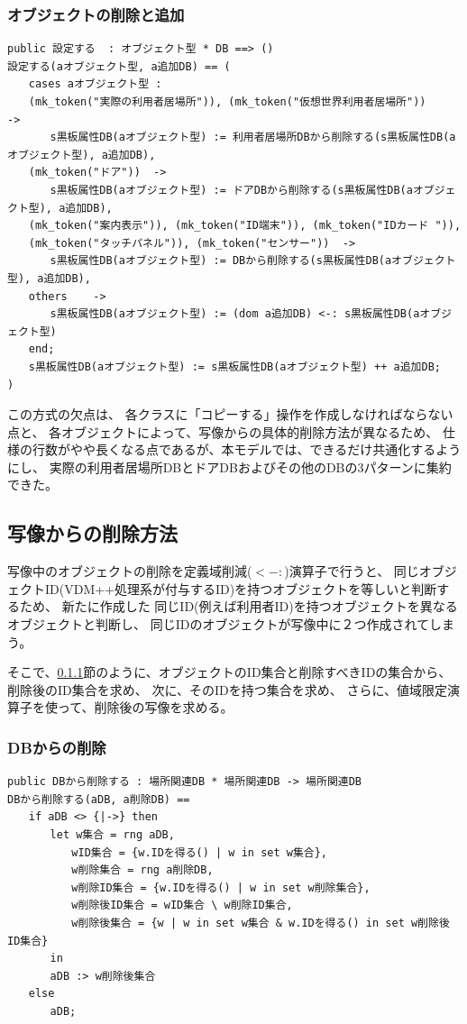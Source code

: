 \documentclass[a4paper,8pt]{jsarticle}
\begin{document}
\subsubsection{オブジェクトの削除と追加}
\label{subsubsection:deleteAndAppend}
\begin{verbatim}
public 設定する  : オブジェクト型 * DB ==> ()
設定する(aオブジェクト型, a追加DB) == (
　　cases aオブジェクト型 :
　　(mk_token("実際の利用者居場所")), (mk_token("仮想世界利用者居場所"))		->
　　　　s黒板属性DB(aオブジェクト型) := 利用者居場所DBから削除する(s黒板属性DB(aオブジェクト型), a追加DB),
　　(mk_token("ドア"))	-> 
　　　　s黒板属性DB(aオブジェクト型) := ドアDBから削除する(s黒板属性DB(aオブジェクト型), a追加DB),
　　(mk_token("案内表示")), (mk_token("ID端末")), (mk_token("IDカード ")), 
　　(mk_token("タッチパネル")), (mk_token("センサー"))	->
　　　　s黒板属性DB(aオブジェクト型) := DBから削除する(s黒板属性DB(aオブジェクト型), a追加DB),
　　others	->
　　　　s黒板属性DB(aオブジェクト型) := (dom a追加DB) <-: s黒板属性DB(aオブジェクト型)
　　end;
　　s黒板属性DB(aオブジェクト型) := s黒板属性DB(aオブジェクト型) ++ a追加DB;
)
\end{verbatim}


この方式の欠点は、
各クラスに「コピーする」操作を作成しなければならない点と、
各オブジェクトによって、写像からの具体的削除方法が異なるため、
仕様の行数がやや長くなる点であるが、本モデルでは、できるだけ共通化するようにし、
実際の利用者居場所DBとドアDBおよびその他のDBの3パターンに集約できた。

\subsection {写像からの削除方法}
\label{subsec:delete}
写像中のオブジェクトの削除を定義域削減($ <-:$)演算子で行うと、
同じオブジェクトID(VDM++処理系が付与するID)を持つオブジェクトを等しいと判断するため、
新たに作成した
同じID(例えば利用者ID)を持つオブジェクトを異なるオブジェクトと判断し、
同じIDのオブジェクトが写像中に２つ作成されてしまう。

そこで、\ref{subsubsection:deleteFromDB}節のように、オブジェクトのID集合と削除すべきIDの集合から、
削除後のID集合を求め、
次に、そのIDを持つ集合を求め、
さらに、値域限定演算子を使って、削除後の写像を求める。

\subsubsection{DBからの削除}
\label{subsubsection:deleteFromDB}
\begin{verbatim}
public DBから削除する : 場所関連DB * 場所関連DB -> 場所関連DB
DBから削除する(aDB, a削除DB) == 
　　if aDB <> {|->} then
　　　　let w集合 = rng aDB,
　　　　　　wID集合 = {w.IDを得る() | w in set w集合},
　　　　　　w削除集合 = rng a削除DB,
　　　　　　w削除ID集合 = {w.IDを得る() | w in set w削除集合},
　　　　　　w削除後ID集合 = wID集合 \ w削除ID集合,
　　　　　　w削除後集合 = {w | w in set w集合 & w.IDを得る() in set w削除後ID集合}
　　　　in
　　　　aDB :> w削除後集合
　　else
　　　　aDB;
\end{verbatim}
\end{document}
